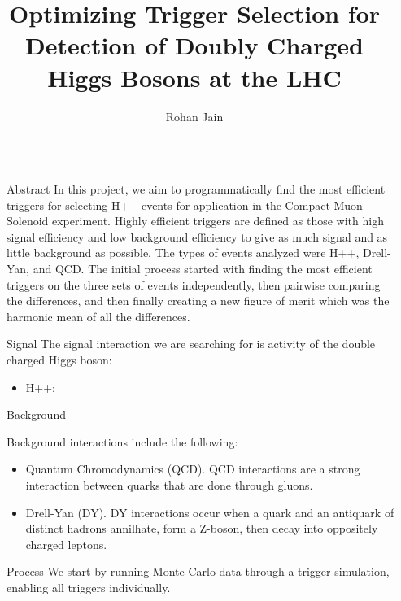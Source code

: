 \documentclass{beamer}
\title{Optimizing Trigger Selection for Detection of Doubly Charged Higgs Bosons at the LHC}
\author{Rohan Jain}
\institute[shortinst]{ {\texttt{rjain@imsa.edu} \\

Illinois Mathematics and Science Academy
}}
\newlength{\sepwidth}
\newlength{\colwidth}
\newcommand{\separatorcolumn}{\begin{column}{\sepwidth}\end{column}}
\begin{document}
\begin{frame}[t]
\begin{columns}[t]
\separatorcolumn

\begin{column}{\colwidth}
  \begin{block}{Abstract}
    In this project, we aim to programmatically find the most efficient triggers for selecting H++ events for application in the Compact Muon Solenoid experiment. Highly efficient triggers are defined as those with high signal efficiency and low background efficiency to give as much signal and as little background as possible. The types of events analyzed were H++, Drell-Yan, and QCD. The initial process started with finding the most efficient triggers on the three sets of events independently, then pairwise comparing the differences, and then finally creating a new figure of merit which was the harmonic mean of all the differences. 
  \end{block}

\begin{block}{Signal}
  The signal interaction we are searching for is activity of the double charged Higgs boson:

  \begin{itemize}
    \item H++: 
  \end{itemize}
\end{block}

  \begin{block}{Background}

    Background interactions include the following:

    \begin{itemize}
      \item Quantum Chromodynamics (QCD). QCD interactions are a strong interaction between quarks that are done through gluons. 
      \item Drell-Yan (DY). DY interactions occur when a quark and an antiquark of distinct hadrons annilhate, form a Z-boson, then decay into oppositely charged leptons.
    \end{itemize}
  \end{block}

  \begin{block}{Process}
    We start by running Monte Carlo data through a trigger simulation, enabling all triggers individually.


\end{block}
\end{column}
\end{columns}
\end{frame}
\end{document}

